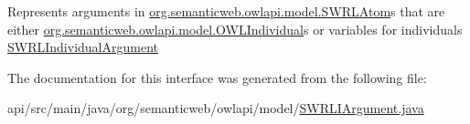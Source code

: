 Represents arguments in \hyperlink{interfaceorg_1_1semanticweb_1_1owlapi_1_1model_1_1_s_w_r_l_atom}{org.\-semanticweb.\-owlapi.\-model.\-S\-W\-R\-L\-Atom}s that are either \hyperlink{interfaceorg_1_1semanticweb_1_1owlapi_1_1model_1_1_o_w_l_individual}{org.\-semanticweb.\-owlapi.\-model.\-O\-W\-L\-Individual}s or variables for individuals \hyperlink{interfaceorg_1_1semanticweb_1_1owlapi_1_1model_1_1_s_w_r_l_individual_argument}{S\-W\-R\-L\-Individual\-Argument} 

The documentation for this interface was generated from the following file\-:\begin{DoxyCompactItemize}
\item 
api/src/main/java/org/semanticweb/owlapi/model/\hyperlink{_s_w_r_l_i_argument_8java}{S\-W\-R\-L\-I\-Argument.\-java}\end{DoxyCompactItemize}
